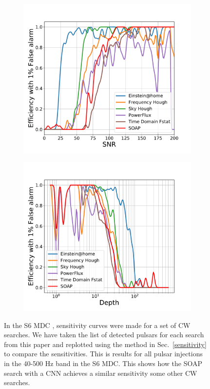 \begin{figure}
	\begin{subfigure}[h]{0.5\textwidth}
		\includegraphics[width=\columnwidth]{C4_cnn/S6MDC_snr.pdf}
		\label{results:snr_s6mdc}
	\end{subfigure}
\begin{subfigure}[h]{0.5\textwidth}
	\includegraphics[width=\columnwidth]{C4_cnn/S6MDC_depth.pdf}
	\label{results:mdccomp}
\end{subfigure}

	\caption{\label{results:s6mdc} In the S6 \ac{MDC} \cite{walsh2016ComparisonMethods}, sensitivity curves were made for a set of \ac{CW} searches. 
		We have taken the list of detected pulsars for each search from this paper \cite{walsh2016ComparisonMethods} and replotted using the method in Sec.~\ref{sensitivity} to compare the sensitivities. 
		This is results for all pulsar injections in the 40-500 Hz band in the S6 \ac{MDC}.
		This shows how the SOAP search with a \ac{CNN} achieves a similar sensitivity some other \ac{CW} searches. 
	}
	
\end{figure}



